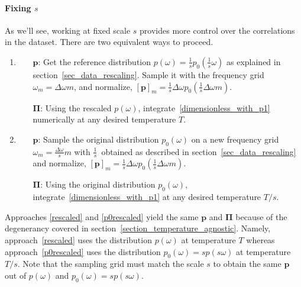 \documentclass[notitlepage,11pt,nofootinbib]{revtex4-1}
\renewcommand{\vec}[1]{\bm{#1}}
\begin{document}
\paragraph*{Fixing $s$}
As we'll see, working at fixed scale $s$ provides more control over the correlations in the dataset. There are two equivalent ways to proceed.
\begin{enumerate}[resume]
\item \label{rescaled}
\begin{itemize}
    \item[$\vec p$:] Get the reference distribution $p(\omega) = \tfrac{1}{s}p_0(\tfrac{1}{s}\omega)$ as explained in section~\ref{sec_data_rescaling}. Sample it with the frequency grid $\omega_m=\Delta\omega m$, and normalize, $[\vec p]_m = \frac{1}{s}\Delta\omega p_0(\frac{1}{s}\Delta\omega m)$.
    \item[$\vec \Pi$:] Using the rescaled $p(\omega)$, integrate~\eqref{dimensionless_with_p1} numerically at any desired temperature $T$.
\end{itemize}
\item \label{p0rescaled}
\begin{itemize}
    \item[$\vec p$:] Sample the original distribution $p_0(\omega)$ on a new frequency grid $\omega_m=\frac{\Delta\omega}{s} m$ with $\frac{1}{s}$~obtained as described in section~\ref{sec_data_rescaling} and normalize, $[\vec p]_m = \frac{1}{s}\Delta\omega p_0(\frac{1}{s}\Delta\omega m)$.

    \item[$\vec \Pi$:] Using the original distribution $p_0(\omega)$, integrate~\eqref{dimensionless_with_p1} at any desired temperature $T/s$.
\end{itemize}
\end{enumerate}
Approaches \ref{rescaled} and \ref{p0rescaled} yield the same $\vec p$ and $\vec \Pi$ because of the degenerancy covered in section~\ref{section_temperature_agnostic}. Namely, approach~\ref{rescaled} uses the distribution $p(\omega)$ at temperature $T$ whereas approach~\ref{p0rescaled} uses the distribution $p_0(\omega)=sp(s\omega)$ at temperature $T/s$. Note that the sampling grid must match the scale $s$ to obtain the same $\vec p$ out of $p(\omega)$ and $p_0(\omega)=sp(s\omega)$.
\end{document}
